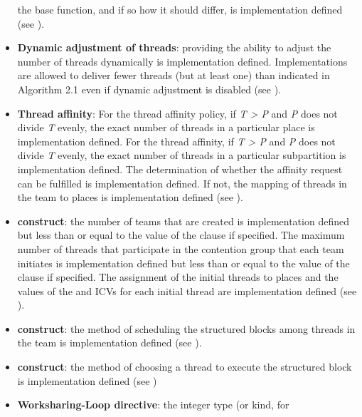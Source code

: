 \begin{itemize}
      the base function, and if so how it should differ, is implementation defined
      (see ).
\item \textbf{Dynamic adjustment of threads}: providing the ability to 
      adjust the number of threads dynamically is implementation defined. 
      Implementations are allowed to deliver fewer threads (but at least one) 
      than indicated in Algorithm 2.1 even if dynamic adjustment is disabled (see 
      ).
\item \textbf{Thread affinity}: For the  thread affinity policy, 
      if \emph{T > P} and \emph{P} does not divide \emph{T} evenly, the exact
      number of threads in a particular place is implementation defined.
      For the  thread affinity, if \emph{T > P} and \emph{P} does not
      divide \emph{T} evenly, the exact number of threads in a particular
      subpartition is implementation defined.  The determination of
      whether the affinity request can be fulfilled is implementation
      defined.  If not, the mapping of threads in the team 
      to places is implementation defined (see
      ).
\item {} \textbf{construct}: the number of teams that are created 
      is implementation defined but less than or equal to the value of the 
       clause if specified. The maximum number of threads 
      that participate in the contention group that each team initiates is
      implementation defined but less than or equal to the value of the 
       clause if specified.  The assignment of the 
      initial threads to places and the values of the  
      and  ICVs for each initial thread are
      implementation defined (see ).
\item {} \textbf{construct}: the method of scheduling the 
      structured blocks among threads in the team is implementation defined 
      (see ).
\item {} \textbf{construct}: the method of choosing a thread to 
      execute the structured block is implementation defined (see 
      )
\item \textbf{Worksharing-Loop directive}: the integer type (or kind, for 

\end{itemize}
